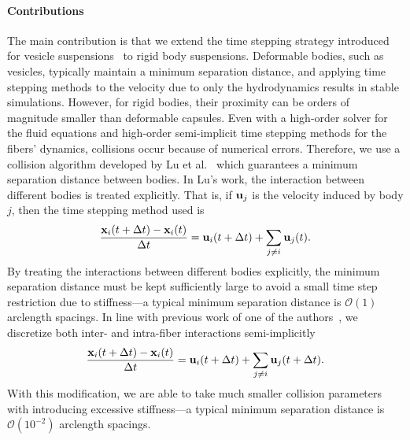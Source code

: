 \documentclass[preprint, 10pt]{elsarticle}
\begin{document}

\paragraph{Contributions} The main contribution is that we extend the
time stepping strategy introduced for vesicle
suspensions~\cite{Quaife2014} to rigid body suspensions.  Deformable
bodies, such as vesicles, typically maintain a minimum separation
distance, and applying time stepping methods to the velocity due to only
the hydrodynamics results in stable simulations.  However, for rigid
bodies, their proximity can be orders of magnitude smaller than
deformable capsules.  Even with a high-order solver for the fluid
equations and high-order semi-implicit time stepping methods for the
fibers' dynamics, collisions occur because of numerical errors.
Therefore, we use a collision algorithm developed by Lu et
al.~\cite{Lu2017} which guarantees a minimum separation distance between
bodies. In Lu's work, the interaction between different bodies is
treated explicitly.  That is, if ${\mathbf{u}}_j$ is the velocity induced by body
$j$, then the time stepping method used is
\begin{align*}
  \frac{{\mathbf{x}}_i(t + \Delta t) -  {\mathbf{x}}_i(t)}{\Delta t} = {\mathbf{u}}_i(t+\Delta t) +
    \sum_{j \neq i} {\mathbf{u}}_j(t).
\end{align*}
By treating the interactions between different bodies explicitly, the
minimum separation distance must be kept sufficiently large to avoid
a small time step restriction due to stiffness---a typical minimum
separation distance is $\mathcal{O}(1)$ arclength spacings.  In line
with previous work of one of the authors~\cite{Quaife2014}, we
discretize both inter- and intra-fiber interactions semi-implicitly
\begin{align*}
  \frac{{\mathbf{x}}_i(t + \Delta t) -  {\mathbf{x}}_i(t)}{\Delta t} = {\mathbf{u}}_i(t+\Delta t) +
    \sum_{j \neq i} {\mathbf{u}}_j(t+\Delta t).
\end{align*}
With this modification, we are able to take much smaller collision
parameters with introducing excessive stiffness---a typical minimum
separation distance is $\mathcal{O}(10^{-2})$ arclength spacings.
\end{document}
